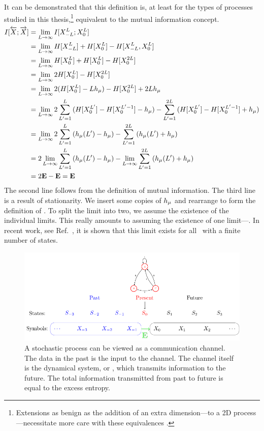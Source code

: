 It can be demonstrated that this definition is, at least for the types of processes studied in this thesis,\footnote{Extensions as benign as the addition of an extra dimension---to a 2D process---necessitate more care with these equivalences .} equivalent to the mutual information concept.
\begin{align*}
I[\smash{\overleftarrow {{X}}};\smash{\overrightarrow{{X}}}] &= \lim_{L \to \infty}{I[{X}_{-L}^{L};{X}_0^{L}]}\\
&= \lim_{L \to \infty}{H[{X}_{-L}^L] + H[{X}_0^{L}]-H[{X}_{-L}^{L}, {X}_0^{L}]}\\
&= \lim_{L \to \infty}{H[{X}_{0}^L] + H[{X}_0^{L}]-H[{X}_0^{2L}]}\\
&= \lim_{L \to \infty}{2H[{X}_{0}^L] -H[{X}_0^{2L}]}\\
&= \lim_{L \to \infty}{2(H[{X}_{0}^L] - Lh_\mu) -H[{X}_0^{2L}] + 2Lh_\mu}\\
&= \lim_{L \to \infty}{2\sum_{L'=1}^{L}{(H[{X}_{0}^{L'}] - H[{X}_0^{L'-1}] - h_\mu)} -\sum_{L'=1}^{2L}{(H[{X}_0^{L'}] -H[{X}_0^{L'-1}] + h_\mu)}}\\
&= \lim_{L \to \infty}{2\sum_{L'=1}^{L}{(h_\mu(L') - h_\mu)} -\sum_{L'=1}^{2L}{(h_\mu(L') + h_\mu)}}\\
&= 2\lim_{L \to \infty}{\sum_{L'=1}^{L}{(h_\mu(L') - h_\mu)}} -\lim_{L \to \infty}{\sum_{L'=1}^{2L}{(h_\mu(L') + h_\mu)}}\\
&= 2 {\bf E} - {\bf E} = {\bf E}
\end{align*}
The second line follows from the definition of mutual information. The third line is a result of stationarity. We insert some copies of $h_\mu$ and rearrange to form the definition of \EE. To split the limit into two, we assume the existence of the individual limits. This really amounts to assuming the existence of one limit---\EE. In recent work, see Ref.~, it is shown that this limit exists for all \eMs\ with a finite number of states.
\begin{figure}[h!]
\centering
\includegraphics[scale=1.1]{../chapter1/figures/tikz/CommunicationChannel}
\caption{A stochastic process can be viewed as a communication channel. The data in the past is the input to the channel. The channel itself is the dynamical system, or \eM, which transmits information to the future. The total information transmitted from past to future is equal to the excess entropy.}
\label{fig:CommunicationChannel}
\end{figure}

